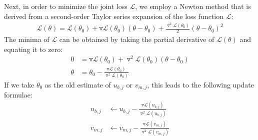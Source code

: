 Next, in order to minimize the joint loss $\mathcal{L}$, we employ a Newton method \cite{doi:10.1137/1.9780898718898} that is derived from a second-order Taylor series expansion of the loss function $\mathcal{L}$:
\begin{align}
\label{eq:newton}
	\mathcal{L}(\theta) = \mathcal{L}(\theta_0) + \triangledown \mathcal{L}(\theta_0) (\theta - \theta_0) + \frac{\triangledown^2 \mathcal{L}(\theta_0)}{2} (\theta - \theta_0)^2
\end{align}
The minima of $\mathcal{L}$ can be obtained by taking the partial derivative of $\mathcal{L}(\theta)$ and equating it to zero:
\begin{align}
0 &= \triangledown \mathcal{L}(\theta_0) + \triangledown^2 \mathcal{L}(\theta_0) (\theta - \theta_0) \nonumber\\
\theta &= \theta_0 - \frac{\triangledown \mathcal{L}(\theta_0)}{\triangledown^2 \mathcal{L}(\theta_0)}
\end{align}
If we take $\theta_0$ as the old estimate of $u_{b,j}$ or $v_{m,j}$, this leads to the following update formulae:
\begin{align}
\label{eqn:update_u}
u_{b,j} &\leftarrow u_{b,j} - \frac{ \triangledown \mathcal{L}(u_{b,j}) }{ \triangledown^2 \mathcal{L}(u_{b,j}) } \\
\label{eqn:update_v}
v_{m,j} &\leftarrow v_{m,j} - \frac{ \triangledown \mathcal{L}(v_{m,j}) }{ \triangledown^2 \mathcal{L}(v_{m,j}) }
\end{align}

